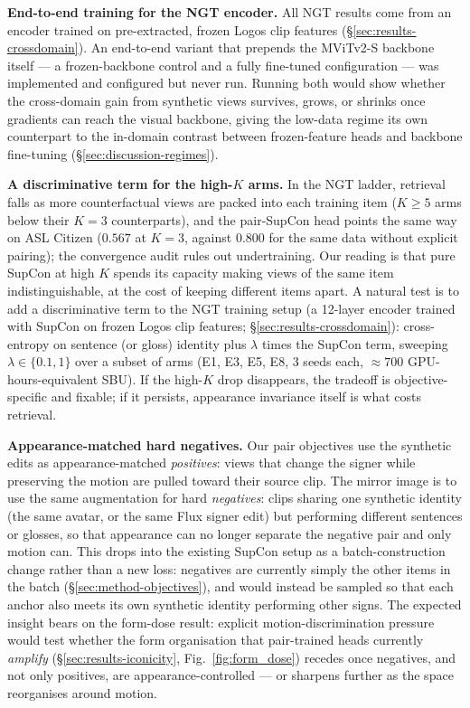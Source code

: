 \textbf{End-to-end training for the NGT encoder.} All NGT results come
from an encoder trained on pre-extracted, frozen Logos clip features
(\S\ref{sec:results-crossdomain}). An end-to-end variant that prepends
the MViTv2-S backbone itself --- a frozen-backbone control and a fully
fine-tuned configuration --- was implemented and configured but never
run. Running both would show whether the cross-domain gain from
synthetic views survives, grows, or shrinks once gradients can reach the
visual backbone, giving the low-data regime its own counterpart to the
in-domain contrast between frozen-feature heads and backbone
fine-tuning (\S\ref{sec:discussion-regimes}).

\textbf{A discriminative term for the high-$K$ arms.}  In the NGT
ladder, retrieval falls as more counterfactual views are packed into
each training item ($K{\geq}5$ arms below their $K{=}3$ counterparts),
and the pair-SupCon head points the same way on ASL Citizen ($0.567$ at
$K{=}3$, against $0.800$ for the same data without explicit pairing);
the convergence audit rules out undertraining. Our reading is that pure
SupCon at high $K$ spends its capacity making views of the same item
indistinguishable, at the cost of keeping different items apart. A
natural test is to add a discriminative term to the NGT training setup
(a 12-layer encoder trained with SupCon on frozen Logos clip features;
\S\ref{sec:results-crossdomain}): cross-entropy on sentence
(or gloss) identity plus $\lambda$ times the SupCon term, sweeping
$\lambda \in \{0.1, 1\}$ over a subset of arms (E1, E3, E5, E8, 3 seeds
each, ${\approx}700$ GPU-hours-equivalent SBU). If the high-$K$ drop
disappears, the tradeoff is objective-specific and fixable; if it
persists, appearance invariance itself is what costs retrieval.

\textbf{Appearance-matched hard negatives.} Our pair objectives use the
synthetic edits as appearance-matched \emph{positives}: views that
change the signer while preserving the motion are pulled toward their
source clip. The mirror image is to use the same augmentation for hard
\emph{negatives}: clips sharing one synthetic identity (the same avatar,
or the same Flux signer edit) but performing different sentences or
glosses, so that appearance can no longer separate the negative pair and
only motion can. This drops into the existing SupCon setup as a
batch-construction change rather than a new loss: negatives are
currently simply the other items in the batch
(\S\ref{sec:method-objectives}), and would instead be sampled so that
each anchor also meets its own synthetic identity performing other
signs. The expected insight bears on the form-dose result: explicit
motion-discrimination pressure would test whether the form organisation
that pair-trained heads currently \emph{amplify}
(\S\ref{sec:results-iconicity}, Fig.~\ref{fig:form_dose}) recedes once
negatives, and not only positives, are appearance-controlled --- or
sharpens further as the space reorganises around
motion.

